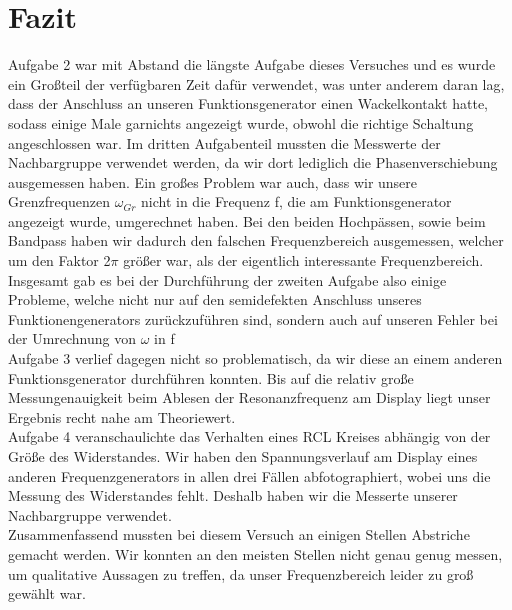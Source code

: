 \documentclass[12pt]{scrartcl}
\begin{document}
\section{Fazit}
Aufgabe 2 war mit Abstand die längste Aufgabe dieses Versuches und es wurde ein Großteil der verfügbaren Zeit dafür verwendet, was unter anderem daran lag, dass der Anschluss an unseren Funktionsgenerator einen Wackelkontakt hatte, sodass einige Male garnichts angezeigt wurde, obwohl die richtige Schaltung angeschlossen war. Im dritten Aufgabenteil mussten die Messwerte der Nachbargruppe verwendet werden, da wir dort lediglich die Phasenverschiebung ausgemessen haben. Ein großes Problem war auch, dass wir unsere Grenzfrequenzen $\omega_{Gr}$ nicht in die Frequenz f, die am Funktionsgenerator angezeigt wurde, umgerechnet haben. Bei den beiden Hochpässen, sowie beim Bandpass haben wir dadurch den falschen Frequenzbereich ausgemessen, welcher um den Faktor 2$\pi$ größer war, als der eigentlich interessante Frequenzbereich. Insgesamt gab es bei der Durchführung der zweiten Aufgabe also einige Probleme, welche nicht nur auf den semidefekten Anschluss unseres Funktionengenerators zurückzuführen sind, sondern auch auf unseren Fehler bei der Umrechnung von $\omega$ in f\\
Aufgabe 3 verlief dagegen nicht so problematisch, da wir diese an einem anderen Funktionsgenerator durchführen konnten. Bis auf die relativ große Messungenauigkeit beim Ablesen der Resonanzfrequenz am Display liegt unser Ergebnis recht nahe am Theoriewert.\\
Aufgabe 4 veranschaulichte das Verhalten eines RCL Kreises abhängig von der Größe des Widerstandes. Wir haben den Spannungsverlauf am Display eines anderen Frequenzgenerators in allen drei Fällen abfotographiert, wobei uns die Messung des Widerstandes fehlt. Deshalb haben wir die Messerte unserer Nachbargruppe verwendet.\\
Zusammenfassend mussten bei diesem Versuch an einigen Stellen Abstriche gemacht werden. Wir konnten an den meisten Stellen nicht genau genug messen, um qualitative Aussagen zu treffen, da unser Frequenzbereich leider zu groß gewählt war.
\end{document}
